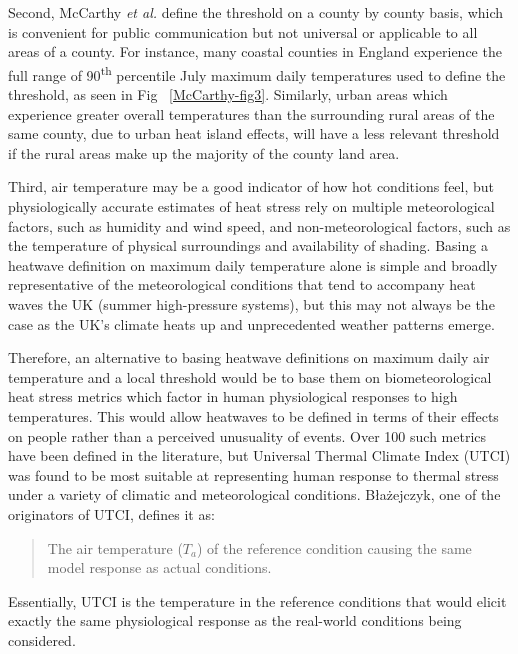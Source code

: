 \documentclass[10pt,letterpaper]{article}
\begin{document}
Second, McCarthy \textit{et al.} define the threshold on a county by county basis, which is convenient for public communication but not universal or applicable to all areas of a county.
For instance, many coastal counties in England experience the full range of 90\textsuperscript{th} percentile July maximum daily temperatures used to define the threshold, as seen in Fig ~\ref{McCarthy-fig3}.\cite{McCarthy2019}
Similarly, urban areas which experience greater overall temperatures than the surrounding rural areas of the same county, due to urban heat island effects, will have a less relevant threshold if the rural areas make up the majority of the county land area.

Third, air temperature may be a good indicator of how hot conditions feel, but physiologically accurate estimates of heat stress rely on multiple meteorological factors, such as humidity and wind speed, and non-meteorological factors, such as the temperature of physical surroundings and availability of shading.
Basing a heatwave definition on maximum daily temperature alone is simple and broadly representative of the meteorological conditions that tend to accompany heat waves the UK (summer high-pressure systems), but this may not always be the case as the UK's climate heats up and unprecedented weather patterns emerge.

Therefore, an alternative to basing heatwave definitions on maximum daily air temperature and a local threshold would be to base them on biometeorological heat stress metrics which factor in human physiological responses to high temperatures.
This would allow heatwaves to be defined in terms of their effects on people rather than a perceived unusuality of events.
Over 100 such metrics have been defined in the literature, but Universal Thermal Climate Index (UTCI) was found to be most suitable at representing human response to thermal stress under a variety of climatic and meteorological conditions.\cite{Blazejczyk2012, DiNapoli2018, Zare2018}
Błażejczyk, one of the originators of UTCI, defines it as:
\begin{quote}
    The air temperature ($T_a$) of the reference condition causing the same model response as actual conditions.\cite{Blazejczyk2012}
\end{quote}
Essentially, UTCI is the temperature in the reference conditions that would elicit exactly the same physiological response as the real-world conditions being considered.
\end{document}
